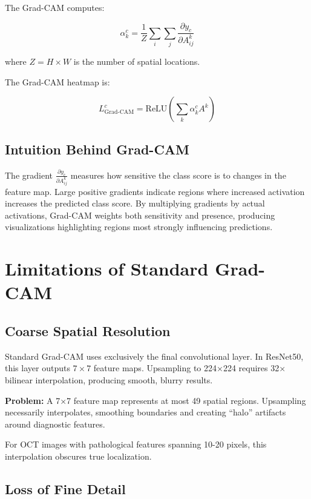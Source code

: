 \documentclass[12pt,a4paper,oneside]{book}
\begin{document}
The Grad-CAM computes:

\begin{equation}
\alpha_k^c = \frac{1}{Z} \sum_{i} \sum_{j} \frac{\partial y_c}{\partial A_{ij}^k}
\label{eq:gradcam_weights}
\end{equation}

where $Z = H \times W$ is the number of spatial locations.

The Grad-CAM heatmap is:

\begin{equation}
L_{\text{Grad-CAM}}^c = \text{ReLU}\left(\sum_{k} \alpha_k^c A^k\right)
\label{eq:gradcam_heatmap}
\end{equation}

\subsection{Intuition Behind Grad-CAM}

The gradient $\frac{\partial y_c}{\partial A_{ij}^k}$ measures how sensitive the class score is to changes in the feature map. Large positive gradients indicate regions where increased activation increases the predicted class score. By multiplying gradients by actual activations, Grad-CAM weights both sensitivity and presence, producing visualizations highlighting regions most strongly influencing predictions.

\section{Limitations of Standard Grad-CAM}

\subsection{Coarse Spatial Resolution}

Standard Grad-CAM uses exclusively the final convolutional layer. In ResNet50, this layer outputs $7 \times 7$ feature maps. Upsampling to 224×224 requires 32× bilinear interpolation, producing smooth, blurry results.

\textbf{Problem:} A 7×7 feature map represents at most 49 spatial regions. Upsampling necessarily interpolates, smoothing boundaries and creating ``halo'' artifacts around diagnostic features.

For OCT images with pathological features spanning 10-20 pixels, this interpolation obscures true localization.

\subsection{Loss of Fine Detail}
\end{document}
